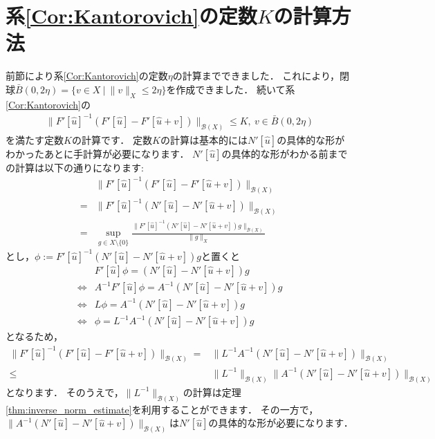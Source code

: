 \section{系\ref{Cor:Kantorovich}の定数\texorpdfstring{$K$}{K}の計算方法}\label{sec:general_K}
前節により系\ref{Cor:Kantorovich}の定数$\eta$の計算までできました．
これにより，閉球$\bar{B}(0, 2\eta )=\{ v \in X ~|~ \| v \|_{X} \le 2\eta \}$を作成できました．
続いて系\ref{Cor:Kantorovich}の
\begin{align*}
	\| F'[\hat{u}]^{-1} \left( F'[\hat{u}] -  F'[\hat{u} + v] \right) \|_{{\mathcal B}(X)} \le K, ~ v \in \bar{B}\left( 0, 2\eta \right)
\end{align*}
を満たす定数$K$の計算です．
定数$K$の計算は基本的には$N'[\hat{u}]$の具体的な形がわかったあとに手計算が必要になります．
$N'[\hat{u}]$の具体的な形がわかる前までの計算は以下の通りになります:
\begin{align*}
	& \| F'[\hat{u}]^{-1} \left( F'[\hat{u}] -  F'[\hat{u} + v] \right) \|_{{\mathcal B}(X)} \\
	 =& \| F'[\hat{u}]^{-1} \left( N'[\hat{u}] -  N'[\hat{u} + v] \right) \|_{{\mathcal B}(X)} \\
	 =& \sup_{g \in X \setminus \{ 0 \} } \frac{ \| F'[\hat{u}]^{-1} \left( N'[\hat{u}] -  N'[\hat{u} + v] \right) g \|_{{\mathcal B}(X)} }{\| g \|_{X}}
\end{align*}
とし，$\phi := F'[\hat{u}]^{-1} \left( N'[\hat{u}] -  N'[\hat{u} + v] \right) g$と置くと
\begin{align*}
	& F'[\hat{u}] \phi = \left( N'[\hat{u}] -  N'[\hat{u} + v] \right) g \\
	\Leftrightarrow& A^{-1}F'[\hat{u}] \phi = A^{-1} \left( N'[\hat{u}] -  N'[\hat{u} + v] \right) g \\
	\Leftrightarrow& L \phi = A^{-1} \left( N'[\hat{u}] -  N'[\hat{u} + v] \right) g \\
	\Leftrightarrow& \phi = L^{-1} A^{-1} \left( N'[\hat{u}] -  N'[\hat{u} + v] \right) g
\end{align*}
となるため，
\begin{align*}
	\| F'[\hat{u}]^{-1} \left( F'[\hat{u}] -  F'[\hat{u} + v] \right) \|_{{\mathcal B}(X)} =& \|  L^{-1} A^{-1} \left( N'[\hat{u}] -  N'[\hat{u} + v] \right) \|_{{\mathcal B}(X)} \\
	\le& \| L^{-1} \|_{{\mathcal B}(X)}  \| A^{-1} \left( N'[\hat{u}] -  N'[\hat{u} + v] \right) \|_{{\mathcal B}(X)}
\end{align*}
となります．
そのうえで，$\| L^{-1} \|_{{\mathcal B}(X)}$の計算は定理\ref{thm:inverse_norm_estimate}を利用することができます．
その一方で，$\| A^{-1} \left( N'[\hat{u}] -  N'[\hat{u} + v] \right) \|_{{\mathcal B}(X)}$は$N'[\hat{u}]$の具体的な形が必要になります．

